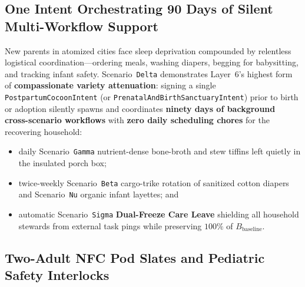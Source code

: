 \subsection{One Intent Orchestrating 90 Days of Silent Multi-Workflow Support}

New parents in atomized cities face sleep deprivation compounded by relentless logistical coordination---ordering meals, washing diapers, begging for babysitting, and tracking infant safety. Scenario~\texttt{Delta} demonstrates Layer~6's highest form of \textbf{compassionate variety attenuation}: signing a single \texttt{PostpartumCocoonIntent} (or \texttt{PrenatalAndBirthSanctuaryIntent}) prior to birth or adoption silently spawns and coordinates \textbf{ninety days of background cross-scenario workflows} with \textbf{zero daily scheduling chores} for the recovering household:
\begin{itemize}
    \item daily Scenario~\texttt{Gamma} nutrient-dense bone-broth and stew tiffins left quietly in the insulated porch box;
    \item twice-weekly Scenario~\texttt{Beta} cargo-trike rotation of sanitized cotton diapers and Scenario~\texttt{Nu} organic infant layettes; and
    \item automatic Scenario~\texttt{Sigma} \textbf{Dual-Freeze Care Leave} shielding all household stewards from external task pings while preserving $100\%$ of $B_{\mathrm{baseline}}$.
\end{itemize}

\subsection{Two-Adult NFC Pod Slates and Pediatric Safety Interlocks}

